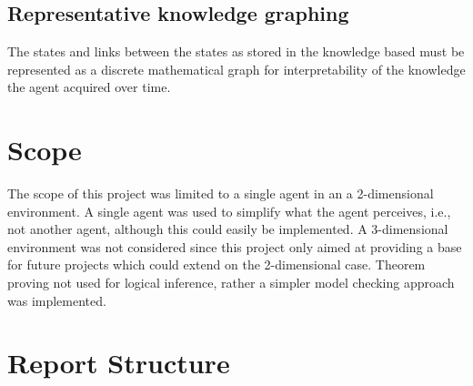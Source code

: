 \subsection{Representative knowledge graphing}
The states and links between the states as stored in the knowledge based must be represented as a discrete mathematical graph for interpretability of the knowledge the agent acquired over time. 





\section{Scope}


The scope of this project was limited to a single agent in an a 2-dimensional environment. A single agent was used to simplify what the agent perceives, i.e., not another agent, although this could easily be implemented. A 3-dimensional environment was not considered since this project only aimed at providing a base for future projects which could extend on the 2-dimensional case. Theorem proving not used for logical inference, rather a simpler model checking approach was implemented.


\section{Report Structure}

